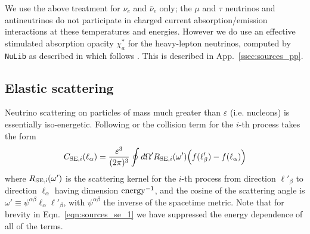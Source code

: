 \documentclass[aps,floatfix,prd,superscriptaddress,twocolumn]{revtex4-1}
\begin{document}
We use the above treatment for $\nu_e$ and $\bar{\nu}_e$ only;
the $\mu$ and $\tau$ neutrinos and antineutrinos do not participate in
charged current absorption/emission interactions at these temperatures
and energies.
However we do use an effective stimulated absorption opacity $\chi^*_a$
for the heavy-lepton neutrinos, computed by \lstinline{NuLib} as
described in \cite{ocon2015-gr1d_with_nu} which follows
\cite{brue1985-core_collapse,burr2006-neutrino_opacities}.
This is described in App.~\ref{ssec:sources_pp}.

\subsection{Elastic scattering}
\label{ssec:sources_se}
Neutrino scattering on particles of mass much greater than $\varepsilon$
(i.e. nucleons) is essentially iso-energetic. Following 
\cite[Eqn.~A8]{brue1985-core_collapse} or
\cite[Eqn.~4.20]{shib2011-truncated_moment} the collision term for the
$i$-th process takes the form
\begin{equation}
  \label{eqn:sources_se_1}
  C_{{\rm SE},i}(\ell_\alpha)
  = \frac{\varepsilon^3}{(2\pi)^3}
  \oint d\Omega' R_{{\rm SE},i}(\omega')
  \Big(f(\ell'_\beta) - f(\ell_\alpha)\Big)
\end{equation}
where $R_{\rm SE,i}(\omega')$ is the scattering kernel for the $i$-th process
from direction $\ell'_\beta$ to direction $\ell_\alpha$
having dimension ${\rm energy}^{-1}$,
and the cosine of the scattering angle is
$\omega' \equiv \psi^{\alpha\beta}\ell_\alpha\ell'_\beta$, with
$\psi^{\alpha\beta}$ the inverse of the spacetime metric.
Note that for brevity in Eqn.~\ref{eqn:sources_se_1} we have suppressed the
energy dependence of all of the terms.
\end{document}
